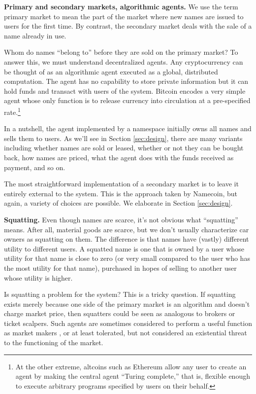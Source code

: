 {\bf Primary and secondary markets, algorithmic agents.} We use the term primary market to mean the part of the market where new names are issued to users for the first time. By contrast, the secondary market deals with the sale of a name already in use. 

Whom do names ``belong to'' before they are sold on the primary market? To answer this, we must understand decentralized agents. Any cryptocurrency can be thought of as an algorithmic agent executed as a global, distributed computation. The agent has no capability to store private information but it can hold funds and transact with users of the system. Bitcoin encodes a very simple agent whose only function is to release currency into circulation at a pre-specified rate.\footnote{At the other extreme, altcoins such as Ethereum allow any user to create an agent by making the central agent ``Turing complete,'' that is, flexible enough to execute arbitrary programs specified by users on their behalf.} 

In a nutshell, the agent implemented by a namespace initially owns all names and sells them to users. As we'll see in Section \ref{sec:design}, there are many variants including whether names are sold or leased, whether or not they can be bought back, how names are priced, what the agent does with the funds received as payment, and so on.

The most straightforward implementation of a secondary market is to leave it entirely external to the system. This is the approach taken by Namecoin, but again, a variety of choices are possible. We elaborate in Section \ref{sec:design}.

{\bf Squatting.} Even though names are scarce, it's not obvious what ``squatting'' means. After all, material goods are scarce, but we don't usually characterize car owners as squatting on them. The difference is that names have (vastly) different utility to different users. A squatted name is one that is owned by a user whose utility for that name is close to zero (or very small compared to the user who has the most utility for that name), purchased in hopes of selling to another user whose utility is higher.

Is squatting a problem for the system? This is a tricky question. If squatting exists merely because one side of the primary market is an algorithm and doesn't charge market price, then squatters could be seen as analogous to brokers or ticket scalpers. Such agents are sometimes considered to perform a useful function as market makers \cite{silber1984marketmaker}, or at least tolerated, but not considered an existential threat to the functioning of the market.

